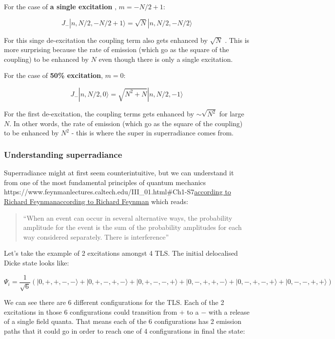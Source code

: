 \documentclass[
]{article}
\let\oldhref\href
\renewcommand{\href}[2]{\ifx#1\urlprefix\oldhref{#1}{#2}\else\uline{\oldhref{#1}{#2}}\fi}
\renewcommand{\[}{\begin{equation}}
\renewcommand{\]}{\end{equation}}
\begin{document}
For the case of \textbf{a single excitation} , \(m=-N/2 + 1\):

\[
J_- |n, N/2, -N/2 +1\rangle  = \sqrt{N}|n, N/2, -N/2\rangle
\]

For this singe de-excitation the coupling term also gets enhanced by
\(\sqrt{N}\) . This is more surprising because the rate of emission
(which go as the square of the coupling) to be enhanced by \(N\) even
though there is only a single excitation.

For the case of \textbf{50\% excitation}, \(m=0\):

\[
J_- |n, N/2, 0 \rangle  = \sqrt{N^2 + N}|n, N/2, -1\rangle
\]

For the first de-excitation, the coupling terms gets enhanced by
\(\sim\sqrt{N^2}\) for large \(N\). In other words, the rate of emission
(which go as the square of the coupling) to be enhanced by \(N^2\) -
this is where the super in superradiance comes from.

\subsubsection{Understanding
superradiance}\label{understanding-superradiance}

Superradiance might at first seem counterintuitive, but we can
understand it from one of the most fundamental principles of quantum
mechanics
\href{https://www.feynmanlectures.caltech.edu/III_01.html\#Ch1-S7}{according
to Richard Feynman} which reads:

\begin{quote}
``When an event can occur in several alternative ways, the probability
amplitude for the event is the sum of the probability amplitudes for
each way considered separately. There is interference''
\end{quote}

Let's take the example of 2 excitations amongst 4 TLS. The initial
delocalised Dicke state looks like:

\[
\Psi_i = \frac{1}{\sqrt{6}}\left(| 0, +, +, -, - \rangle + | 0, +, -, +, - \rangle + | 0, +, -, -, + \rangle + | 0, -, +, +, - \rangle + | 0, -, +, -, + \rangle + | 0, -, -, +, + \rangle \right)
\]

We can see there are 6 different configurations for the TLS. Each of the
2 excitations in those 6 configurations could transition from \(+\) to a
\(-\) with a release of a single field quanta. That means each of the 6
configurations has 2 emission paths that it could go in order to reach
one of 4 configurations in final the state:
\end{document}
